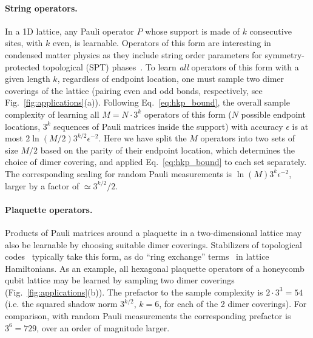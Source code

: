\documentclass[a4paper,twocolumns,11pt,accepted=2024-03-04]{quantumarticle}
\begin{document}
\paragraph{String operators.} In a 1D lattice, any Pauli operator $P$ whose support is made of $k$ consecutive sites, with $k$ even, is learnable. Operators of this form are interesting in condensed matter physics as they include string order parameters for symmetry-protected topological (SPT) phases~\cite{haegeman_order_2012}. To learn {\it all} operators of this form with a given length $k$, regardless of endpoint location, one must sample two dimer coverings of the lattice (pairing even and odd bonds, respectively, see Fig.~\ref{fig:applications}(a)). Following Eq.~\eqref{eq:hkp_bound},
the overall sample complexity of learning {all} $M = N\cdot 3^k$ operators of this form ($N$ possible endpoint locations, $3^k$ sequences of Pauli matrices inside the support) with accuracy $\epsilon$ is at most $2 \ln(M/2) 3^{k/2}\epsilon^{-2}$. 
Here we have split the $M$ operators into two sets of size $M/2$ based on the parity of their endpoint location, which determines the choice of dimer covering, and applied Eq.~\eqref{eq:hkp_bound} to each set separately.
The corresponding scaling for random Pauli measurements is $\ln(M) 3^k \epsilon^{-2}$, larger by a factor of $\simeq 3^{k/2} / 2$. 

\paragraph{Plaquette operators.}
Products of Pauli matrices around a plaquette in a two-dimensional lattice may also be learnable by choosing suitable dimer coverings.
Stabilizers of topological codes~\cite{bombin_introduction_2013} typically take this form, as do ``ring exchange'' terms~\cite{thouless_exchange_1965} in lattice Hamiltonians.
As an example, all hexagonal plaquette operators of a honeycomb qubit lattice may be learned by sampling two dimer coverings (Fig.~\ref{fig:applications}(b)). The prefactor to the sample complexity is $2\cdot 3^3 = 54$ (i.e. the squared shadow norm $3^{k/2}$, $k=6$, for each of the 2 dimer coverings). 
For comparison, with random Pauli measurements the corresponding prefactor is $3^6 = 729$, over an order of magnitude larger.
\end{document}
